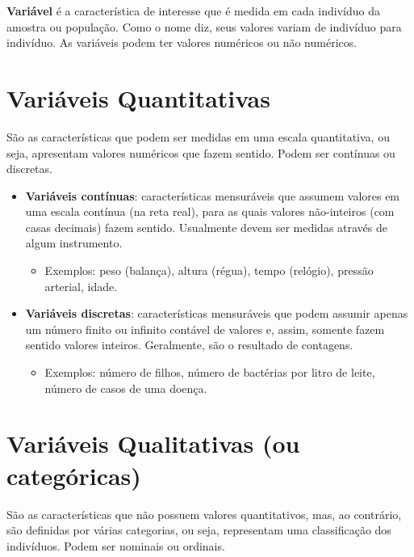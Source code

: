 \documentclass[
]{book}
\providecommand{\tightlist}{%
  \setlength{\itemsep}{0pt}\setlength{\parskip}{0pt}}
\begin{document}
\textbf{Variável} é a característica de interesse que é medida em cada indivíduo da amostra ou população. Como o nome diz, seus valores variam de indivíduo para indivíduo. As variáveis podem ter valores numéricos ou não numéricos.

\hypertarget{variuxe1veis-quantitativas}{%
\section{Variáveis Quantitativas}\label{variuxe1veis-quantitativas}}

São as características que podem ser medidas em uma escala quantitativa, ou seja, apresentam valores numéricos que fazem sentido. Podem ser contínuas ou discretas.

\begin{itemize}
\tightlist
\item
  \textbf{Variáveis contínuas}: características mensuráveis que assumem valores em uma escala contínua (na reta real), para as quais valores não-inteiros (com casas decimais) fazem sentido. Usualmente devem ser medidas através de algum instrumento.

  \begin{itemize}
  \tightlist
  \item
    Exemplos: peso (balança), altura (régua), tempo (relógio), pressão arterial, idade.
  \end{itemize}
\item
  \textbf{Variáveis discretas}: características mensuráveis que podem assumir apenas um número finito ou infinito contável de valores e, assim, somente fazem sentido valores inteiros. Geralmente, são o resultado de contagens.

  \begin{itemize}
  \tightlist
  \item
    Exemplos: número de filhos, número de bactérias por litro de leite, número de casos de uma doença.
  \end{itemize}
\end{itemize}

\hypertarget{variuxe1veis-qualitativas-ou-categuxf3ricas}{%
\section{Variáveis Qualitativas (ou categóricas)}\label{variuxe1veis-qualitativas-ou-categuxf3ricas}}

São as características que não possuem valores quantitativos, mas, ao contrário, são definidas por várias categorias, ou seja, representam uma classificação dos indivíduos. Podem ser nominais ou ordinais.
\end{document}
